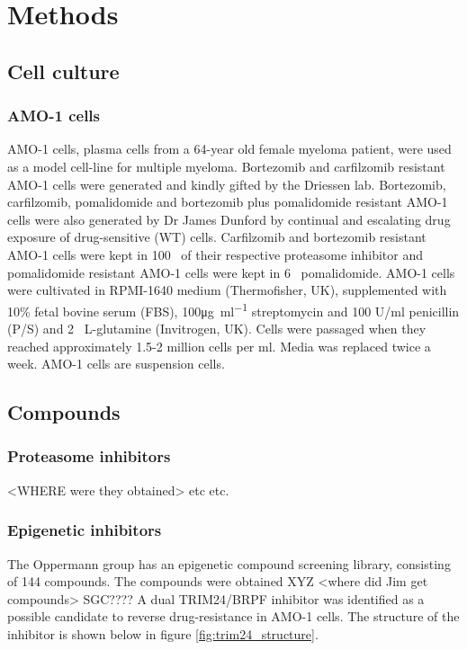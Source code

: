 \chapter{\label{ch:3-methods}Methods}


\section{Cell culture}
\subsection{AMO-1 cells}
AMO-1 cells, plasma cells from a 64-year old female myeloma patient, were used as a model cell-line for multiple myeloma.
Bortezomib and carfilzomib resistant AMO-1 cells were generated and kindly gifted by the Driessen lab\cite{soriano2016proteasome}.
Bortezomib, carfilzomib, pomalidomide and bortezomib plus pomalidomide resistant AMO-1 cells were also generated by Dr James Dunford by continual and escalating drug exposure of drug-sensitive (WT) cells.
Carfilzomib and bortezomib resistant AMO-1 cells were kept in 100\si{\nano\Molar} of their respective proteasome inhibitor and pomalidomide resistant AMO-1 cells were kept in 6\si{\micro\Molar} pomalidomide.
AMO-1 cells were cultivated in RPMI-1640 medium (Thermofisher, UK), supplemented with 10\% fetal bovine serum (FBS), 100\si{\ug\per\ml} streptomycin and 100 U/ml penicillin (P/S) and 2\si{\milli\Molar} L-glutamine (Invitrogen, UK).
Cells were passaged when they reached approximately 1.5-2 million cells per \si{\ml}.
Media was replaced twice a week.
AMO-1 cells are suspension cells.

\section{Compounds}

\subsection{Proteasome inhibitors}
<WHERE were they obtained> etc etc.

\subsection{Epigenetic inhibitors}
The Oppermann group has an epigenetic compound screening library, consisting of 144 compounds.
The compounds were obtained XYZ <where did Jim get compounds> SGC????
A dual TRIM24/BRPF inhibitor was identified as a possible candidate to reverse drug-resistance in AMO-1 cells.
The structure of the inhibitor is shown below in figure \ref{fig:trim24_structure}.

